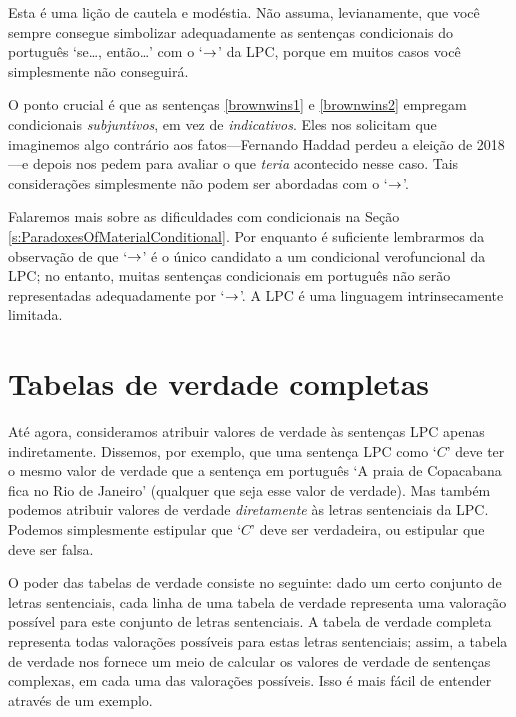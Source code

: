 Esta é uma lição de cautela e modéstia.
Não assuma, levianamente, que você sempre consegue simbolizar adequadamente as sentenças condicionais do português `se\ldots, então\ldots' com o `$\rightarrow$' da LPC, porque em muitos casos você simplesmente não conseguirá.

O ponto crucial é que as sentenças \ref{brownwins1} e \ref{brownwins2} empregam condicionais \emph{subjuntivos}, em vez de \emph{indicativos}.
Eles nos solicitam que imaginemos algo contrário aos fatos---Fernando Haddad perdeu a eleição de 2018---e depois nos pedem para avaliar o que \emph{teria} acontecido nesse caso.
Tais considerações simplesmente não podem ser abordadas com o  `$\rightarrow$'.

Falaremos mais sobre as dificuldades com condicionais na Seção \ref{s:ParadoxesOfMaterialConditional}.
Por enquanto é suficiente lembrarmos da observação de que `$\rightarrow$' é o único candidato a um condicional verofuncional da LPC; no entanto, muitas sentenças condicionais em português não serão representadas adequadamente por `$\rightarrow$'.
A LPC é uma linguagem intrinsecamente limitada.


\chapter{Tabelas de verdade completas}
\label{s:CompleteTruthTables}

Até agora, consideramos atribuir valores de verdade às sentenças LPC apenas indiretamente.
Dissemos, por exemplo, que uma sentença LPC como `$C$' deve ter o mesmo valor de verdade que a sentença em português `A praia de Copacabana fica no Rio de Janeiro' (qualquer que seja esse valor de verdade).
Mas também podemos atribuir valores de verdade \emph{diretamente} às letras sentenciais da LPC.
Podemos simplesmente estipular que `$C$' deve ser verdadeira, ou estipular que deve ser falsa.

O poder das tabelas de verdade consiste no seguinte:
dado um certo conjunto de letras sentenciais, cada linha de uma tabela de verdade representa uma valoração possível para este conjunto de letras sentenciais.
A tabela de verdade completa representa todas valorações possíveis para estas letras sentenciais; assim, a tabela de verdade nos fornece um meio de calcular os valores de verdade de sentenças complexas, em cada uma das valorações possíveis.
Isso é mais fácil de entender através de um exemplo.

